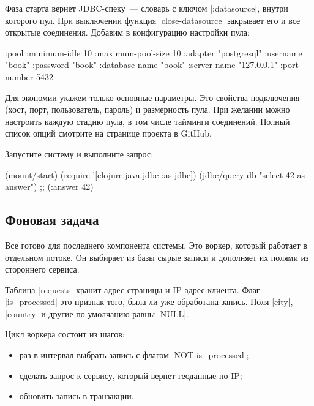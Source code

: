 Фаза старта вернет JDBC-спеку~--- словарь с ключом \spverb|:datasource|, внутри
которого пул. При выключении функция \spverb|close-datasource| закрывает его и
все открытые соединения. Добавим в конфигурацию настройки пула:

\begin{english}
  \begin{clojure}
{:pool {:minimum-idle       10
        :maximum-pool-size  10
        :adapter            "postgresql"
        :username           "book"
        :password           "book"
        :database-name      "book"
        :server-name        "127.0.0.1"
        :port-number        5432}}
  \end{clojure}
\end{english}

Для экономии укажем только основные параметры. Это свойства подключения (хост,
порт, пользователь, пароль) и размерность пула. При желании можно настроить
каждую стадию пула, в том числе тайминги соединений. Полный список опций
смотрите на странице проекта в GitHub.

Запустите систему и выполните запрос:

\begin{english}
  \begin{clojure}
(mount/start)
(require '[clojure.java.jdbc :as jdbc])
(jdbc/query db "select 42 as answer")
;; ({:answer 42})
  \end{clojure}
\end{english}

\subsection{Фоновая задача}

\label{worker}

Все готово для последнего компонента системы. Это воркер, который работает в
отдельном потоке. Он выбирает из базы сырые записи и дополняет их полями из
стороннего сервиса.

Таблица \spverb|requests| хранит адрес страницы и IP-адрес клиента. Флаг
\spverb|is_processed| это признак того, была ли уже обработана запись. Поля
\spverb|city|, \spverb|country| и другие по умолчанию равны \spverb|NULL|.

Цикл воркера состоит из шагов:

\begin{itemize}

\item
  раз в интервал выбрать запись с флагом \spverb|NOT is_processed|;

\item
  сделать запрос к сервису, который вернет геоданные по IP;

\item
  обновить запись в транзакции.

\end{itemize}


